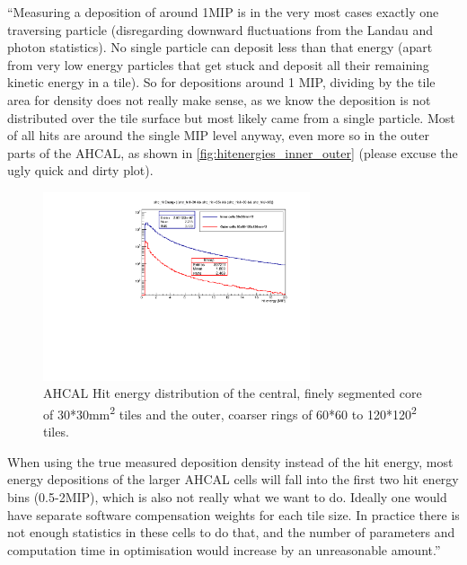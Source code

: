 \documentclass[twoside,a4paper,12pt]{article}
\begin{document}
``Measuring a deposition of around 1MIP is in the very most cases exactly one traversing particle (disregarding downward fluctuations from the Landau and photon statistics). No single particle can deposit less than that energy (apart from very low energy particles that get stuck and deposit all their remaining kinetic energy in a tile). So for depositions around 1 MIP, dividing by the tile area for density does not really make sense, as we know the deposition is not distributed over the tile surface but most likely came from a single particle. Most of all hits are around the single MIP level anyway, even more so in the outer parts of the AHCAL, as shown in \autoref{fig:hitenergies_inner_outer} (please excuse the ugly quick and dirty plot).
\begin{figure}[htbp]
\begin{center}
\includegraphics[width=0.7\textwidth,page=1]{hitenergy_AHCAL_inner_vs_outer_cells_560474_MC}
\caption{AHCAL Hit energy distribution of the central, finely segmented core of 30*30mm\textsuperscript{2} tiles and the outer, coarser rings of 60*60 to 120*120\textsuperscript{2} tiles.}
\label{fig:hitenergies_inner_outer}
\end{center}
\end{figure}
 When using the true measured deposition density instead of the hit energy, most energy depositions of the larger AHCAL cells will fall into the first two hit energy bins (0.5-2MIP), which is also not really what we want to do. Ideally one would have separate software compensation weights for each tile size. In practice there is not enough statistics in these cells to do that, and the number of parameters and computation time in optimisation would increase by an unreasonable amount.''
\end{document}
